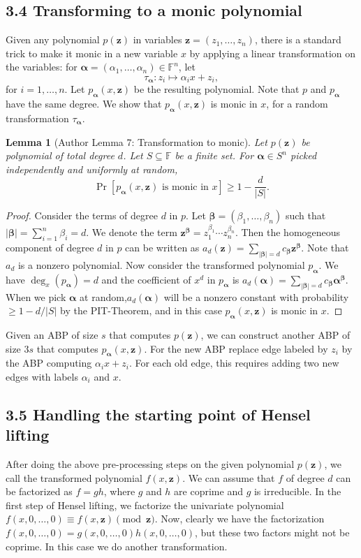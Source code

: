 \documentclass[10pt,a4paper]{article}
\newtheorem{ntlemma}[nttheorem]{Lemma}
\begin{document}
\subsection*{3.4 Transforming to a monic polynomial}
Given any polynomial $p(\mathbf z)$ in variables $\mathbf z=(z_1,\ldots,z_n)$, there is a standard trick to make it monic in a new variable $x$ by applying a linear transformation on the variables: for $\boldsymbol\alpha=(\alpha_1,\ldots,\alpha_n)\in\mathbb F^n$, let
\[\tau_{\boldsymbol\alpha}:z_i\mapsto\alpha_ix+z_i,\]
for $i=1,\ldots,n$. Let $p_{\boldsymbol\alpha}(x,\mathbf z)$ be the resulting polynomial. Note that $p$ and $p_{\boldsymbol\alpha}$ have the same degree. We show that $p_{\boldsymbol\alpha}(x,\mathbf z)$ is monic in $x$, for a random transformation $\tau_{\boldsymbol\alpha}$.
\begin{ntlemma}[Author Lemma 7: Transformation to monic]
Let $p(\mathbf z)$ be polynomial of total degree $d$. Let $S\subseteq\mathbb F$ be a finite set. For $\boldsymbol\alpha\in S^n$ picked independently and uniformly at random,
\[\Pr[p_{\boldsymbol\alpha}(x,\mathbf z)\text{ is monic in }x]\geq1-\frac d{|S|}.\]
\end{ntlemma}
\begin{proof}
Consider the terms of degree $d$ in $p$. Let $\boldsymbol\beta=(\beta_1,\ldots,\beta_n)$ such that $|\boldsymbol\beta|=\sum_{i=1}^n\beta_i=d$. We denote the term $\mathbf z^{\boldsymbol\beta}=z_1^{\beta_1}\cdots z_n^{\beta_n}$. Then the homogeneous component of degree $d$ in $p$ can be written as $a_d(\mathbf z)=\sum_{|\boldsymbol\beta|=d}c_{\boldsymbol\beta}\mathbf z^{\boldsymbol\beta}$. Note that $a_d$ is a nonzero polynomial.
Now consider the transformed polynomial $p_{\boldsymbol\alpha}$. We have $\deg_x(p_{\boldsymbol\alpha})=d$ and the coefficient of $x^d$ in $p_{\boldsymbol\alpha}$ is $a_d(\boldsymbol\alpha)=\sum_{|\boldsymbol\beta|=d}c_{\boldsymbol\beta}\boldsymbol\alpha^{\boldsymbol\beta}$. When we pick $\boldsymbol\alpha$ at random,$a_d(\boldsymbol\alpha)$ will be a nonzero constant with probability $\geq1-d/|S|$ by the PIT-Theorem, and in this case $p_{\boldsymbol\alpha}(x,\mathbf z)$ is monic in $x$.
\end{proof}
Given an ABP of size $s$ that computes $p(\mathbf z)$, we can construct another ABP of size $3s$ that computes $p_{\boldsymbol\alpha}(x,\mathbf z)$. For the new ABP replace edge labeled by $z_i$ by the ABP computing $\alpha_ix+z_i$. For each old edge, this requires adding two new edges with labels $\alpha_i$ and $x$.
\subsection*{3.5 Handling the starting point of Hensel lifting}
After doing the above pre-processing steps on the given polynomial $p(\mathbf z)$, we call the transformed polynomial $f(x,\mathbf z)$. We can assume that $f$ of degree $d$ can be factorized as $f=gh$, where $g$ and $h$ are coprime and $g$ is irreducible. In the first step of Hensel lifting, we factorize the univariate polynomial $f(x,0,\ldots,0)\equiv f(x,\mathbf z)\pmod{\mathbf z}$. Now, clearly we have the factorization $f(x,0,\ldots,0)=g(x,0,\ldots,0)h(x,0,\ldots,0)$, but these two factors might not be coprime. In this case we do another transformation.
\end{document}
